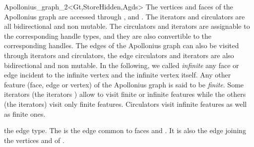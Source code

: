 \begin{ccRefClass}{Apollonius_graph_2<Gt,StoreHidden,Agds>}
The vertices and faces of the Apollonius graph are accessed through 
, 
 and . 
The iterators and circulators
are all bidirectional and non mutable.
The circulators and iterators are assignable to the 
corresponding handle types, and they are also convertible to the
corresponding handles.
The edges of the Apollonius graph can also be visited through iterators
and circulators,
the edge circulators and iterators
are also bidirectional and non mutable.
In the following, we called {\it infinite} any face or edge 
incident  to the infinite vertex and the infinite vertex itself.
 Any other feature (face, edge or vertex) of the Apollonius graph is said 
to be {\it finite}.
Some iterators (the  iterators ) allow to visit finite or 
infinite features while the others (the  iterators) visit only
finite features. Circulators visit infinite features as well as finite 
ones.

%
 {the edge type.
The  is the edge common to faces  and 
. It is also the edge joining the vertices
 and  of .}
%
{}
%
\ccGlue
{}
\ccGlue
{}
\ccGlue
{}
\ccGlue
{}
\ccGlue
{}
\ccGlue
{}
\ccGlue
{}
\ccGlue
{}
\ccGlue
{}
\ccGlue
{}
\ccGlue
{}



\end{ccRefClass}
